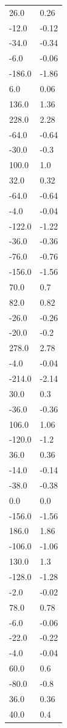 \begin{longtable}{ll}
26.0 & 0.26 \\
-12.0 & -0.12 \\
-34.0 & -0.34 \\
-6.0 & -0.06 \\
-186.0 & -1.86 \\
6.0 & 0.06 \\
136.0 & 1.36 \\
228.0 & 2.28 \\
-64.0 & -0.64 \\
-30.0 & -0.3 \\
100.0 & 1.0 \\
32.0 & 0.32 \\
-64.0 & -0.64 \\
-4.0 & -0.04 \\
-122.0 & -1.22 \\
-36.0 & -0.36 \\
-76.0 & -0.76 \\
-156.0 & -1.56 \\
70.0 & 0.7 \\
82.0 & 0.82 \\
-26.0 & -0.26 \\
-20.0 & -0.2 \\
278.0 & 2.78 \\
-4.0 & -0.04 \\
-214.0 & -2.14 \\
30.0 & 0.3 \\
-36.0 & -0.36 \\
106.0 & 1.06 \\
-120.0 & -1.2 \\
36.0 & 0.36 \\
-14.0 & -0.14 \\
-38.0 & -0.38 \\
0.0 & 0.0 \\
-156.0 & -1.56 \\
186.0 & 1.86 \\
-106.0 & -1.06 \\
130.0 & 1.3 \\
-128.0 & -1.28 \\
-2.0 & -0.02 \\
78.0 & 0.78 \\
-6.0 & -0.06 \\
-22.0 & -0.22 \\
-4.0 & -0.04 \\
60.0 & 0.6 \\
-80.0 & -0.8 \\
36.0 & 0.36 \\
40.0 & 0.4 \\

\end{longtable}
